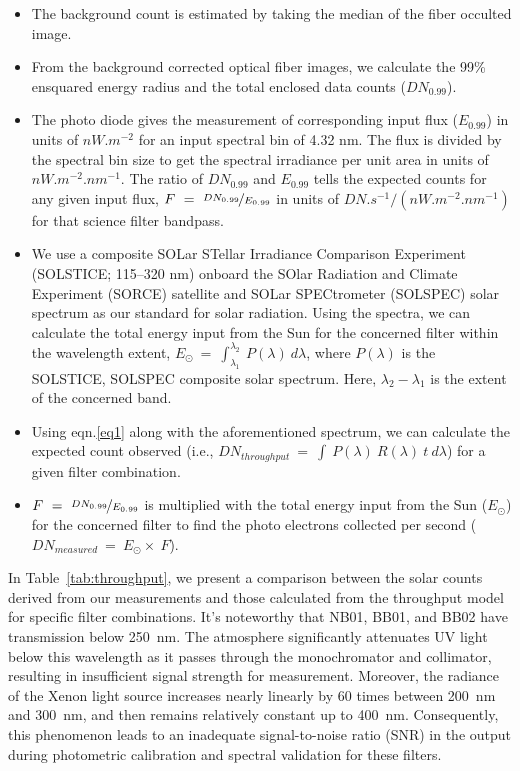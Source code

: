 \begin{itemize}
     \item The background count is estimated by taking the median of the fiber occulted image.
     \item From the background corrected optical fiber images, we calculate the 99\% ensquared energy radius and the total enclosed data counts ($DN_{0.99}$).
     \item The photo diode gives the measurement of corresponding input flux ($E_{0.99}$) in units of $nW.m^{-2}$ for an input spectral bin of 4.32 nm. The flux is divided by the spectral bin size to get the spectral irradiance per unit area in units of $nW.m^{-2}.nm^{-1}$. The ratio of $DN_{0.99}$ and ${E_{0.99}}$ tells the expected counts for any given input flux, $F~=~\nicefrac{DN_{0.99}}{E_{0.99}}$ in units of $DN.s^{-1}/(nW.m^{-2}.nm^{-1})$ for that science filter bandpass.
     \item We use a composite SOLar STellar Irradiance Comparison Experiment (SOLSTICE; 115{--}320 nm) onboard the SOlar Radiation and Climate Experiment (SORCE) \cite{rottman05,harder05,mcclintock05} satellite and SOLar SPECtrometer (SOLSPEC) \cite{thuillier09} solar spectrum as our standard for solar radiation. Using the spectra, we can calculate the total energy input from the Sun for the concerned filter within the wavelength extent, $E_{\odot}~=~\int_{\lambda_{1}}^{\lambda_{2}}~P(\lambda)~d\lambda$, where $P(\lambda)$ is the SOLSTICE, SOLSPEC composite solar spectrum. Here, $\lambda_{2}-\lambda_{1}$ is the extent of the concerned band.
     \item Using eqn.\ref{eq1} along with the aforementioned spectrum, we can calculate the expected count observed (i.e., $DN_{throughput}~=~\int~P(\lambda)~R(\lambda)~t~d\lambda$) for a given filter combination.
     \item $F~=~\nicefrac{DN_{0.99}}{E_{0.99}}$ is multiplied with the total energy input from the Sun ($E_{\odot}$) for the concerned filter to find the photo electrons collected per second ($DN_{measured}~=~E_{\odot}\times~F$).
 \end{itemize}  

In Table~\ref{tab:throughput}, we present a comparison between the solar counts derived from our measurements and those calculated from the throughput model for specific filter combinations. It's noteworthy that NB01, BB01, and BB02 have transmission below 250~nm. The atmosphere significantly attenuates UV light below this wavelength as it passes through the monochromator and collimator, resulting in insufficient signal strength for measurement. Moreover, the radiance of the Xenon light source increases nearly linearly by 60 times between 200~nm and 300~nm, and then remains relatively constant up to 400~nm. Consequently, this phenomenon leads to an inadequate signal-to-noise ratio (SNR) in the output during photometric calibration and spectral validation for these filters.

